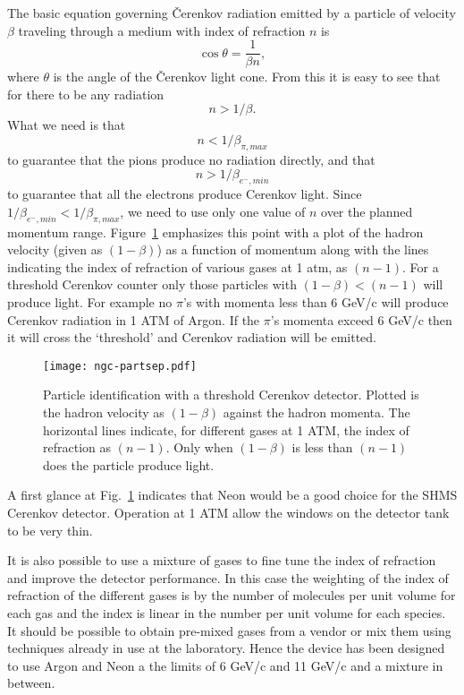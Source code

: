 {The basic equation  governing \v Cerenkov radiation emitted by a particle 
of velocity $\beta$ traveling through a medium with index of refraction
$n$ is \begin{equation}\cos \theta = \frac{1}{\beta n},\end{equation}
where $\theta$ is the angle of the \v Cerenkov light cone.
From this it is easy to see that for there to be any radiation
$$n > 1/\beta.$$ What we need is that
\begin{equation} n < 1/\beta_{\pi,max}\label{eq:index} \end{equation}
to guarantee that the pions produce no radiation directly, and that
\begin{equation} n > 1/\beta_{e^-,min} \end{equation}
to guarantee that all the electrons produce Cerenkov light. Since
$1/\beta_{e^-,min} < 1/\beta_{\pi,max}$, we need to use only one value
of $n$ over the planned momentum range. Figure~\ref{fig:partsep}
emphasizes this point with a plot of the hadron velocity (given as
$(1-\beta)$) as a function of momentum along with the lines indicating
the index of refraction of various gases at 1 atm, as $(n-1)$.  For a
threshold Cerenkov counter only those particles with $(1-\beta) <
(n-1)$ will produce light. For example no $\pi$'s with momenta less
than 6 GeV/c will produce Cerenkov radiation in 1 ATM of Argon. If the
$\pi$'s momenta exceed 6 GeV/c then it will cross the `threshold' and
Cerenkov radiation will be emitted.
 \begin{figure}[!h] %
   \centering
   \texttt{[image: ngc-partsep.pdf]} 
   \caption{Particle identification with a threshold Cerenkov
     detector. Plotted is the hadron velocity as $(1-\beta)$ against
     the hadron momenta. The horizontal lines indicate, for different
     gases at 1 ATM, the index of refraction as $(n-1)$. Only when
     $(1-\beta)$ is less than $(n-1)$ does the particle produce
     light.}
   \label{fig:partsep}
\end{figure}
A first glance at Fig.~\ref{fig:partsep} indicates that Neon would be
a good choice for the SHMS Cerenkov detector. Operation at 1 ATM allow
the windows on the detector tank to be very thin.

It is also possible to use a mixture of gases to fine tune the index
of refraction and improve the detector performance. In this case the
weighting of the index of refraction of the different gases is by the
number of molecules per unit volume for each gas and the index is
linear in the number per unit volume for each species. It should be
possible to obtain pre-mixed gases from a vendor or mix them using
techniques already in use at the laboratory. Hence the device has been
designed to use Argon and Neon a the limits of 6 GeV/c and 11 GeV/c
and a mixture in between.


}
